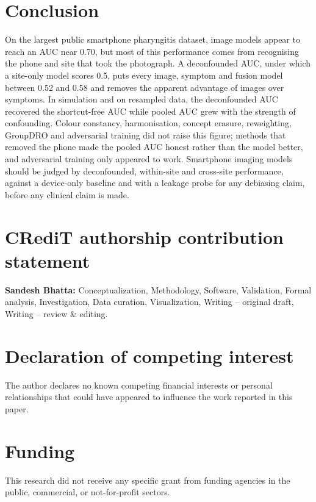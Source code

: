 \documentclass[preprint,12pt]{elsarticle}
\begin{document}
\section{Conclusion}
\label{sec:conclusion}

On the largest public smartphone pharyngitis dataset, image models appear to reach an AUC near 0.70, but most of this performance comes from recognising the phone and site that took the photograph. A deconfounded AUC, under which a site-only model scores 0.5, puts every image, symptom and fusion model between 0.52 and 0.58 and removes the apparent advantage of images over symptoms. In simulation and on resampled data, the deconfounded AUC recovered the shortcut-free AUC while pooled AUC grew with the strength of confounding. Colour constancy, harmonisation, concept erasure, reweighting, GroupDRO and adversarial training did not raise this figure; methods that removed the phone made the pooled AUC honest rather than the model better, and adversarial training only appeared to work. Smartphone imaging models should be judged by deconfounded, within-site and cross-site performance, against a device-only baseline and with a leakage probe for any debiasing claim, before any clinical claim is made.

\section*{CRediT authorship contribution statement}
\textbf{Sandesh Bhatta:} Conceptualization, Methodology, Software, Validation, Formal analysis, Investigation, Data curation, Visualization, Writing -- original draft, Writing -- review \& editing.

\section*{Declaration of competing interest}
The author declares no known competing financial interests or personal relationships that could have appeared to influence the work reported in this paper.

\section*{Funding}
This research did not receive any specific grant from funding agencies in the public, commercial, or not-for-profit sectors.
\end{document}
